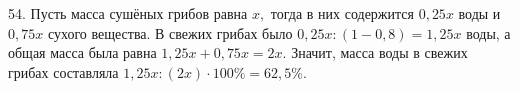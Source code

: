 54. Пусть масса сушёных грибов равна $x,$ тогда в них содержится $0,25x$ воды и $0,75x$ сухого вещества. В свежих грибах было $0,25x:(1-0,8)=1,25x$ воды, а общая масса была равна $1,25x+0,75x=2x.$ Значит, масса воды в свежих грибах составляла $1,25x:(2x)\cdot100\%=62,5\%.$\\
